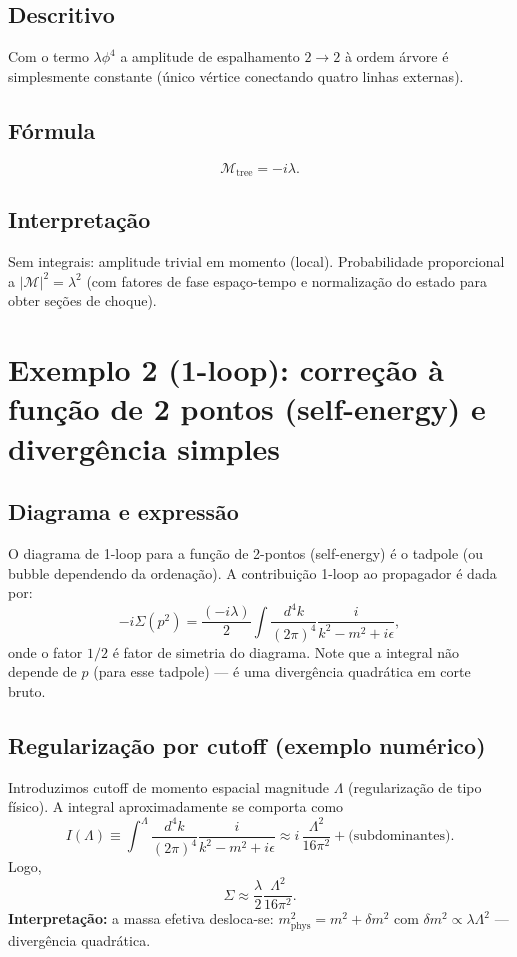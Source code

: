 \documentclass[12pt,a4paper]{article}
\begin{document}
\subsection{Descritivo}
Com o termo \(\lambda\phi^4\) a amplitude de espalhamento \(2\to2\) à ordem árvore é simplesmente constante (único vértice conectando quatro linhas externas).

\subsection{Fórmula}
\begin{equation}\label{amp_tree}
\mathcal{M}_{\text{tree}} = -i\lambda.
\end{equation}

\subsection{Interpretação}
Sem integrais: amplitude trivial em momento (local). Probabilidade proporcional a \(|\mathcal{M}|^2 = \lambda^2\) (com fatores de fase espaço-tempo e normalização do estado para obter seções de choque).

\section{Exemplo 2 (1-loop): correção à função de 2 pontos (self-energy) e divergência simples}
\subsection{Diagrama e expressão}
O diagrama de 1-loop para a função de 2-pontos (self-energy) é o tadpole (ou bubble dependendo da ordenação). A contribuição 1-loop ao propagador é dada por:
\begin{equation}\label{self_raw}
-i \Sigma(p^2) = \frac{(-i\lambda)}{2} \int \frac{d^4k}{(2\pi)^4} \frac{i}{k^2 - m^2 + i\epsilon},
\end{equation}
onde o fator \(1/2\) é fator de simetria do diagrama. Note que a integral não depende de \(p\) (para esse tadpole) — é uma divergência quadrática em corte bruto.

\subsection{Regularização por cutoff (exemplo numérico)}
Introduzimos cutoff de momento espacial magnitude \(\Lambda\) (regularização de tipo físico). A integral aproximadamente se comporta como
\begin{equation}
I(\Lambda) \equiv \int^{\Lambda} \frac{d^4k}{(2\pi)^4} \frac{i}{k^2 - m^2 + i\epsilon} \approx i\,\frac{\Lambda^2}{16\pi^2} + \text{(subdominantes)}.
\end{equation}
Logo,
\begin{equation}
\Sigma \approx \frac{\lambda}{2} \frac{\Lambda^2}{16\pi^2}.
\end{equation}
\textbf{Interpretação:} a massa efetiva desloca-se: \(m^2_{\text{phys}} = m^2 + \delta m^2\) com \(\delta m^2 \propto \lambda \Lambda^2\) — divergência quadrática.
\end{document}
